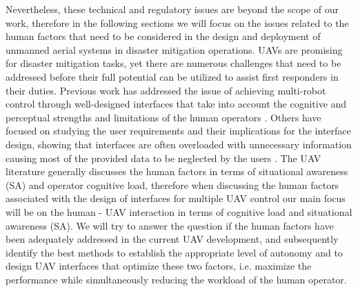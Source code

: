\documentclass[12pt, letterpaper, oneside]{article}
\begin{document}
Nevertheless, these technical and regulatory issues are beyond the scope of our work, therefore in the following sections we will focus on the issues related to the human factors that need to be considered in the design and deployment of unmanned aerial systems in disaster mitigation operations. UAVs are promising for disaster mitigation tasks, yet there are numerous challenges that need to be addressed before their full potential can be utilized to assist first responders in their duties. Previous work has addressed the issue of achieving multi-robot control through well-designed interfaces that take into account the cognitive and perceptual strengths and limitations of the human operators \cite{11, 25}. Others have focused on studying the user requirements and their implications for the interface design, showing that interfaces are often overloaded with unnecessary information causing most of the provided data to be neglected by the users \cite{7, 22}. The UAV literature generally discusses the human factors in terms of situational awareness (SA) and operator cognitive load, therefore when discussing the human factors associated with the design of interfaces for multiple UAV control our main focus will be on the human - UAV interaction in terms of cognitive load and situational awareness (SA). We will try to answer the question if the human factors have been adequately addressed in the current UAV development, and subsequently identify the best methods to establish the appropriate level of autonomy and to design UAV interfaces that optimize these two factors, i.e. maximize the performance while simultaneously reducing the workload of the human operator.   
\end{document}
